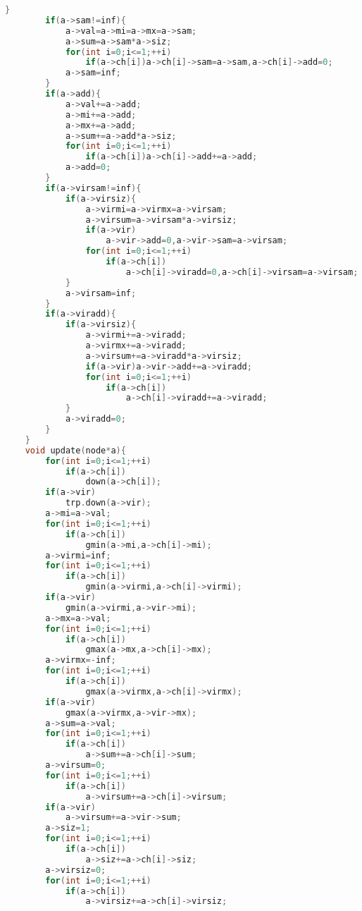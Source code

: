 \documentclass{book}
\begin{document}
\begin{lstlisting}[language=C++,title={Dynamic Tree (Self-Adjusting Top Tree).hpp (12629 bytes, 443 lines)}]
        }
        if(a->sam!=inf){
            a->val=a->mi=a->mx=a->sam;
            a->sum=a->sam*a->siz;
            for(int i=0;i<=1;++i)
                if(a->ch[i])a->ch[i]->sam=a->sam,a->ch[i]->add=0;
            a->sam=inf;
        }
        if(a->add){
            a->val+=a->add;
            a->mi+=a->add;
            a->mx+=a->add;
            a->sum+=a->add*a->siz;
            for(int i=0;i<=1;++i)
                if(a->ch[i])a->ch[i]->add+=a->add;
            a->add=0;
        }
        if(a->virsam!=inf){
            if(a->virsiz){
                a->virmi=a->virmx=a->virsam;
                a->virsum=a->virsam*a->virsiz;
                if(a->vir)
                    a->vir->add=0,a->vir->sam=a->virsam;
                for(int i=0;i<=1;++i)
                    if(a->ch[i])
                        a->ch[i]->viradd=0,a->ch[i]->virsam=a->virsam;
            }
            a->virsam=inf;
        }
        if(a->viradd){
            if(a->virsiz){
                a->virmi+=a->viradd;
                a->virmx+=a->viradd;
                a->virsum+=a->viradd*a->virsiz;
                if(a->vir)a->vir->add+=a->viradd;
                for(int i=0;i<=1;++i)
                    if(a->ch[i])
                        a->ch[i]->viradd+=a->viradd;
            }
            a->viradd=0;
        }
    }
    void update(node*a){
        for(int i=0;i<=1;++i)
            if(a->ch[i])
                down(a->ch[i]);
        if(a->vir)
            trp.down(a->vir);
        a->mi=a->val;
        for(int i=0;i<=1;++i)
            if(a->ch[i])
                gmin(a->mi,a->ch[i]->mi);
        a->virmi=inf;
        for(int i=0;i<=1;++i)
            if(a->ch[i])
                gmin(a->virmi,a->ch[i]->virmi);
        if(a->vir)
            gmin(a->virmi,a->vir->mi);
        a->mx=a->val;
        for(int i=0;i<=1;++i)
            if(a->ch[i])
                gmax(a->mx,a->ch[i]->mx);
        a->virmx=-inf;
        for(int i=0;i<=1;++i)
            if(a->ch[i])
                gmax(a->virmx,a->ch[i]->virmx);
        if(a->vir)
            gmax(a->virmx,a->vir->mx);
        a->sum=a->val;
        for(int i=0;i<=1;++i)
            if(a->ch[i])
                a->sum+=a->ch[i]->sum;
        a->virsum=0;
        for(int i=0;i<=1;++i)
            if(a->ch[i])
                a->virsum+=a->ch[i]->virsum;
        if(a->vir)
            a->virsum+=a->vir->sum;
        a->siz=1;
        for(int i=0;i<=1;++i)
            if(a->ch[i])
                a->siz+=a->ch[i]->siz;
        a->virsiz=0;
        for(int i=0;i<=1;++i)
            if(a->ch[i])
                a->virsiz+=a->ch[i]->virsiz;

\end{lstlisting}
\end{document}

